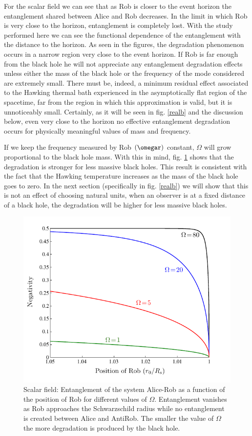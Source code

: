 For the scalar field we can see that as Rob is closer to the event horizon
the entanglement shared between Alice and Rob decreases. In the limit in
which Rob is very close to the horizon, entanglement is completely lost.
With the study performed here we can see the functional
dependence of the entanglement with the distance to the horizon. As seen in the figures,
 the degradation phenomenon occurs in a narrow region very close
to the event horizon. If Rob is far enough from the black hole he will not
appreciate any entanglement degradation effects unless either the mass of the black hole or the frequency of the mode considered are extremely small. There must be, indeed, a minimum residual effect associated to the Hawking thermal bath experienced in the asymptotically flat region of the spacetime, far from the region in which this approximation is valid, but it is unnoticeably small. Certainly, as it will be seen in fig. \ref{realb} and the discussion below, even very close to the horizon no effective entanglement degradation 
 occurs for physically meaningful values of mass and frequency.  
 
If we keep the frequency measured by Rob $(\omegar)$ constant,
$\Omega$ will grow proportional to  the black hole mass. With this in
mind, fig. \ref{sncca} shows that the degradation is stronger for less
massive black holes. This result is consistent with the fact that the
Hawking temperature increases as the mass of the black hole goes to
zero. In the next section (specifically in fig. \ref{realb}) we will show
that this is not an effect of choosing natural units, when an observer is at
a fixed distance of a black hole, the degradation will be higher for less
massive black holes.

\begin{figure}[h]
\begin{center}
\includegraphics[width=.85\textwidth]{arboswa}
\caption{Scalar field: Entanglement of the system Alice-Rob as a function of the position of Rob for different values of $\Omega$. Entanglement vanishes as Rob approaches
the Schwarzschild radius while no entanglement is created between Alice and AntiRob. The smaller the value of $\Omega$ the more degradation is produced by the black hole.}
\label{sncca}
\end{center}
\end{figure}

